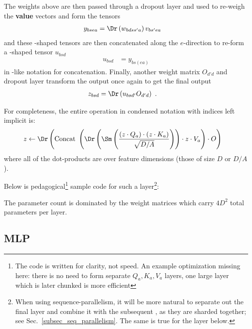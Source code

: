 The weights above are then passed through a dropout layer and used to re-weigh the \textbf{value} vectors and form the tensors
\begin{align}
	y _{ bse a} & =\Dr  \left (w _{ bdss' a} \right ) v _{ bs'ea }
	\label{eq_reweighted_values}
\end{align}
and these -shaped tensors
are then concatenated along the $ e $-direction to re-form a -shaped
tensor $ u _{ bsd } $
\begin{align}
    u _{ bsd } & = y _{ bs(e a) }
\end{align}
in \href{https://einops.rocks/1-einops-basics/}{}-like notation for concatenation.
Finally, another weight matrix $ O _{d' d } $ and dropout layer transform the output once again to get the final
output
\begin{align}
	z _{ bsd } & = \Dr \left (u  _{ bsd' } O _{ d'd }\right )\ .
\end{align}

For completeness, the entire operation in condensed notation with indices left implicit is:
\begin{align}
	z & \leftarrow \Dr \left ({\rm Concat} \ \left ( \Dr \left (\Sm  \left ( \frac{ \left ( z \cdot Q _{ a } \right )\cdot \left ( z \cdot K _{ a } \right )}{ \sqrt{D/A} }
		\right)\right )\cdot z \cdot V _{ a } \right ) \cdot O \right ) \label{eq_causal_attn}
\end{align}
where all of the dot-products are over feature dimensions (those of size $ D $ or $ D/A $).

Below is pedagogical\footnote{The
code is written for clarity, not speed. An example optimization missing here: there is no need to
form separate $ Q _{ a },K _{ a },V _{ a} $  layers, one large layer which is later
chunked is more efficient} sample code for such a   layer\footnote{When
	using sequence-parallelism, it will be more natural to separate out the final  layer
	and combine it with the subsequent , as they are sharded together; see
	Sec.~\ref{subsec_seq_parallelism}. The same is true for the  layer below.}:

The parameter count is dominated by the weight matrices which carry $ 4 D ^{ 2 } $ total parameters
per layer.


\subsection{MLP \label{subsubsec_mlp} }

